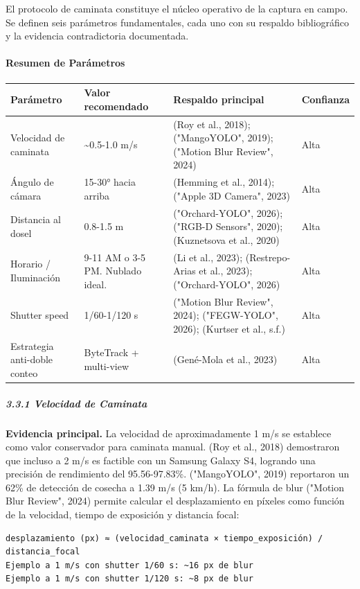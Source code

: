 El protocolo de caminata constituye el núcleo operativo de la captura en campo. Se definen seis parámetros fundamentales, cada uno con su respaldo bibliográfico y la evidencia contradictoria documentada.


\paragraph{Resumen de Parámetros}



\begin{tabular}{llll}
\hline
Parámetro & Valor recomendado & Respaldo principal & Confianza \\
\hline
Velocidad de caminata & \textasciitilde{}0.5-1.0 m/s & (Roy et al., 2018); ("MangoYOLO", 2019); ("Motion Blur Review", 2024) & Alta \\
Ángulo de cámara & 15-30° hacia arriba & (Hemming et al., 2014); ("Apple 3D Camera", 2023) & Alta \\
Distancia al dosel & 0.8-1.5 m & ("Orchard-YOLO", 2026); ("RGB-D Sensors", 2020); (Kuznetsova et al., 2020) & Alta \\
Horario / Iluminación & 9-11 AM o 3-5 PM. Nublado ideal. & (Li et al., 2023); (Restrepo-Arias et al., 2023); ("Orchard-YOLO", 2026) & Alta \\
Shutter speed & 1/60-1/120 s & ("Motion Blur Review", 2024); ("FEGW-YOLO", 2026); (Kurtser et al., s.f.) & Alta \\
Estrategia anti-doble conteo & ByteTrack + multi-view & (Gené-Mola et al., 2023) & Alta \\
\hline
\end{tabular}


\subparagraph{3.3.1 Velocidad de Caminata}


\textbf{Evidencia principal.} La velocidad de aproximadamente 1 m/s se establece como valor conservador para caminata manual. (Roy et al., 2018) demostraron que incluso a 2 m/s es factible con un Samsung Galaxy S4, logrando una precisión de rendimiento del 95.56-97.83\%. ("MangoYOLO", 2019) reportaron un 62\% de detección de cosecha a 1.39 m/s (5 km/h). La fórmula de blur ("Motion Blur Review", 2024) permite calcular el desplazamiento en píxeles como función de la velocidad, tiempo de exposición y distancia focal:


\begin{verbatim}
desplazamiento (px) ≈ (velocidad_caminata × tiempo_exposición) / distancia_focal
Ejemplo a 1 m/s con shutter 1/60 s: ~16 px de blur
Ejemplo a 1 m/s con shutter 1/120 s: ~8 px de blur
\end{verbatim}


